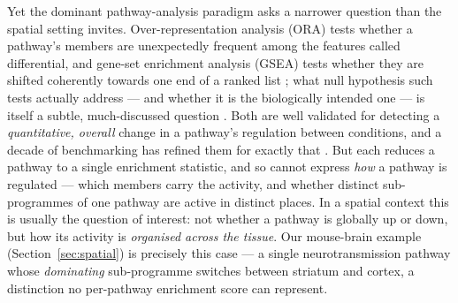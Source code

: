 \documentclass[11pt]{article}
\begin{document}
Yet the dominant pathway-analysis paradigm asks a narrower question than the spatial setting
invites. Over-representation analysis (ORA) tests whether a pathway's members are unexpectedly
frequent among the features called differential, and gene-set enrichment analysis (GSEA)
tests whether they are shifted coherently towards one end of a ranked list
\citep{subramanian2005}; what null hypothesis such tests actually address --- and whether it
is the biologically intended one --- is itself a subtle, much-discussed question
\citep{goeman2007}. Both are well validated for detecting a \emph{quantitative, overall}
change in a pathway's regulation between conditions, and a decade of benchmarking has refined
them for exactly that \citep{khatri2012}. But each reduces a pathway to a single enrichment
statistic, and so cannot express \emph{how} a pathway is regulated --- which members carry the
activity, and whether distinct sub-programmes of one pathway are active in distinct places. In
a spatial context this is usually the question of interest: not whether a pathway is globally
up or down, but how its activity is \emph{organised across the tissue}. Our mouse-brain
example (Section~\ref{sec:spatial}) is precisely this case --- a single neurotransmission
pathway whose \emph{dominating} sub-programme switches between striatum and cortex, a
distinction no per-pathway enrichment score can represent.
\end{document}
